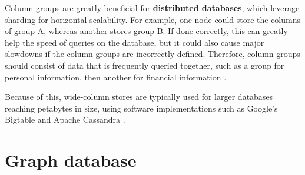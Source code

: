 \noindent Column groups are greatly beneficial for \textbf{distributed databases}, which leverage sharding for horizontal scalability. For example,
one node could store the columns of group A, whereas another stores group B. If done correctly, this can greatly help the speed of queries
on the database, but it could also cause major slowdowns if the column groups are incorrectly defined. Therefore, column groups should 
consist of data that is frequently queried together, such as a group for personal information, then another for financial information \autocite{cattellScalableSQLNoSQL2011}. 


\para Because of this, wide-column stores are typically used for larger databases reaching petabytes in size, using software implementations such as 
Google's Bigtable \autocite{changBigtableDistributedStorage2008} and Apache Cassandra \autocite{apacheApacheCassandraApache}.


\section{Graph database}
